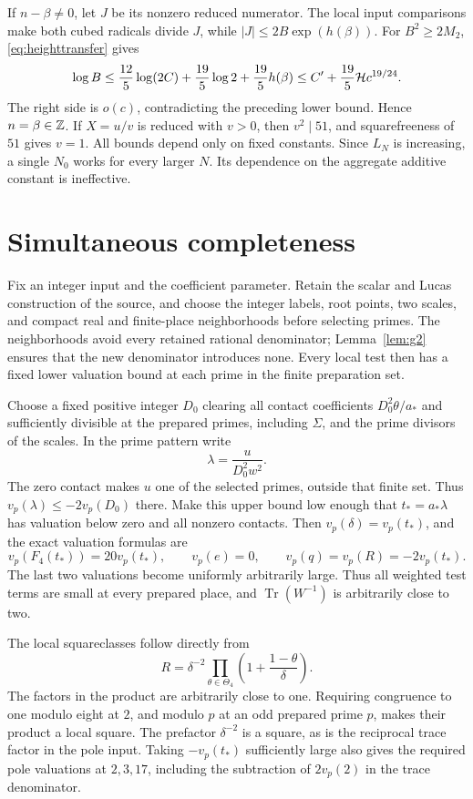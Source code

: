 \documentclass[11pt,a4paper]{article}
\DeclareMathOperator{\Tr}{Tr}\DeclareMathOperator{\Nm}{Nm}
\begin{document}
If $n-\beta\ne0$, let $J$ be its nonzero reduced numerator.
The local input comparisons make both cubed radicals divide $J$,
while $|J|\le2B\exp(h(\beta))$. For $B^2\ge2M_2$,
\eqref{eq:heighttransfer} gives
\[
 \log B\le\frac{12}{5}\log(2C)+\frac{19}{5}\log2
                +\frac{19}{5}h(\beta)
 \le C'+\frac{19}{5}\mathcal H c^{19/24}.
\]
The right side is $o(c)$, contradicting the preceding lower bound.
Hence $n=\beta\in\mathbb Z$. If $X=u/v$ is reduced with $v>0$, then
$v^2\mid51$, and squarefreeness of $51$ gives $v=1$.
All bounds depend only on fixed constants. Since $L_N$ is increasing,
a single $N_0$ works for every larger $N$. Its dependence on the
aggregate additive constant is ineffective.

\section{Simultaneous completeness}
Fix an integer input and the coefficient parameter. Retain the scalar
and Lucas construction of the source, and choose the integer labels,
root points, two scales, and compact real and finite-place neighborhoods
before selecting primes. The neighborhoods avoid every retained
rational denominator; Lemma~\ref{lem:g2} ensures that the new
denominator introduces none. Every local test then has a fixed lower
valuation bound at each prime in the finite preparation set.

Choose a fixed positive integer $D_0$ clearing all contact coefficients
$D_0^2\theta/a_*$ and sufficiently divisible at the prepared primes,
including $\Sigma$, and the prime divisors of the scales. In the prime
pattern write
\[
                         \lambda=\frac{u}{D_0^2w^2}.
\]
The zero contact makes $u$ one of the selected primes, outside that
finite set. Thus $v_p(\lambda)\le-2v_p(D_0)$ there. Make this upper
bound low enough that $t_*=a_*\lambda$ has valuation below zero and
all nonzero contacts. Then $v_p(\delta)=v_p(t_*)$, and the exact
valuation formulas are
\[
 v_p(F_4(t_*))=20v_p(t_*),\qquad v_p(e)=0,\qquad
 v_p(q)=v_p(R)=-2v_p(t_*).
\]
The last two valuations become uniformly arbitrarily large. Thus
all weighted test terms are small at every prepared place, and
$\Tr(W^{-1})$ is arbitrarily close to two.

The local squareclasses follow directly from
\begin{equation}\label{eq:preparedsquare}
 R=\delta^{-2}\prod_{\theta\in\Theta_4}
                 \left(1+\frac{1-\theta}{\delta}\right).
\end{equation}
The factors in the product are arbitrarily close to one. Requiring
congruence to one modulo eight at $2$, and modulo $p$ at an odd
prepared prime $p$, makes their product a local square. The prefactor
$\delta^{-2}$ is a square, as is the reciprocal trace factor in the
pole input. Taking $-v_p(t_*)$ sufficiently large also gives the
required pole valuations at $2,3,17$, including the subtraction
of $2v_p(2)$ in the trace denominator.
\end{document}
